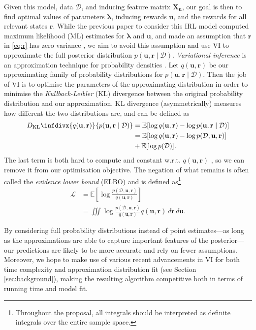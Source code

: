 \documentclass{mpaper}
\newcommand{\DKL}{D_{\mathrm{KL}}\infdivx}
\newcommand{\dx}{\,d\mathbf{r}\,d\mathbf{u}}
\newcommand{\pfull}{p(\mathcal{D}, \mathbf{u}, \mathbf{r})}
\newcommand{\approximation}{q(\mathbf{u}, \mathbf{r})}
\newcommand{\posterior}{p(\mathbf{u}, \mathbf{r} \mid \mathcal{D})}
\begin{document}
Given this model, data $\mathcal{D}$, and inducing feature matrix
$\mathbf{X_u}$, our goal is then to find optimal values of parameters
$\bm\lambda$, inducing rewards $\mathbf{u}$, and the rewards for all relevant
states $\mathbf{r}$. While the previous paper to consider this IRL model
computed maximum likelihood (ML) estimates for $\bm\lambda$ and $\mathbf{u}$,
and made an assumption that $\mathbf{r}$ in \eqref{eq:r} has zero variance
\cite{DBLP:conf/nips/LevinePK11}, we aim to avoid this assumption and use
VI to approximate the full posterior distribution $\posterior$.
\emph{Variational inference} is an approximation technique for probability
densities \cite{blei2017variational}. Let $\approximation$ be our approximating
family of probability distributions for $\posterior$. Then the job of VI is to
optimise the parameters of the approximating distribution in order to minimise
the \emph{Kullback-Leibler} (KL) divergence between the original probability
distribution and our approximation.  KL divergence (asymmetrically) measures how
different the two distributions are, and can be defined as
\cite{blei2017variational}
\begin{align*}
  \DKL{\approximation}{\posterior} &= \mathbb{E}[\log\approximation - \log\posterior ] \\
                                   &= \mathbb{E}[\log\approximation - \log\pfull] \\
                                   &+ \mathbb{E}[\log p(\mathcal{D})].
\end{align*}
The last term is both hard to compute and constant w.r.t. $\approximation$
\cite{blei2017variational}, so we can remove it from our optimisation objective.
The negation of what remains is often called the \emph{evidence lower bound}
(ELBO) and is defined as\footnote{Throughout the proposal, all integrals should
  be interpreted as definite integrals over the entire sample space.}
\cite{DBLP:books/lib/Bishop07,blei2017variational}
\begin{equation} \label{eq:elbo}
  \begin{split}
    \mathcal{L} &= \mathbb{E}\left[ \log \frac{\pfull}{\approximation} \right] \\
    &= \iiint \log \frac{\pfull}{\approximation} \approximation\dx.
  \end{split}
\end{equation}

By considering full probability distributions instead of point estimates---as
long as the approximations are able to capture important features of the
posterior---our predictions are likely to be more accurate and rely on fewer
assumptions. Moreover, we hope to make use of various recent advancements in VI
for both time complexity and approximation distribution fit (see Section
\ref{sec:background}), making the resulting algorithm competitive both in terms of
running time and model fit.
\end{document}
